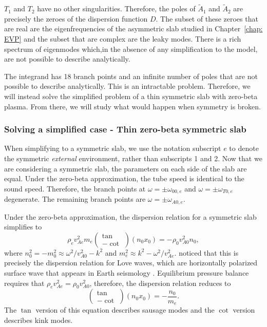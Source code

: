 \documentclass[12pt]{../style-files/ociamthesis}
\begin{document}
$T_1$ and $T_2$ have no other singularities. Therefore, the poles of $\tilde{A}_1$ and $\tilde{A}_2$ are precisely the zeroes of the dispersion function $D$. The subset of these zeroes that are real are the eigenfrequencies of the asymmetric slab studied in Chapter~\ref{chap: EVP} and the subset that are complex are the leaky modes. There is a rich spectrum of eigenmodes which,in the absence of any simplification to the model, are not possible to describe analytically.

The integrand has 18 branch points and an infinite number of poles that are not possible to describe analytically. This is an intractable problem. Therefore, we will instead solve the simplified problem of a thin symmetric slab with zero-beta plasma. From there, we will study what would happen when symmetry is broken.

\subsubsection{Solving a simplified case - Thin zero-beta symmetric slab}

When simplifying to a symmetric slab, we use the notation subscript $e$ to denote the symmetric \textit{external} environment, rather than subscripts 1 and 2. Now that we are considering a symmetric slab, the parameters on each side of the slab are equal. Under the zero-beta approximation, the tube speed is identical to the sound speed. Therefore, the branch points at $\omega = \pm \omega_{00,e}$ and $\omega = \pm\omega_{T0,e}$ degenerate. The remaining branch points are $\omega = \pm \omega_{A0,e}$.

Under the zero-beta approximation, the dispersion relation for a symmetric slab simplifies to
\begin{equation}
\rho_ev_{Ae}^2m_e\left(
\begin{matrix}
\tan \\
-\cot
\end{matrix} \right)(n_0x_0) = -\rho_0v_{A0}^2n_0,
\end{equation}
where $n_0^2 = -m_0^2 \approx \omega^2/v_{A0}^2 - k^2$ and $m_e^2 \approx k^2 - \omega^2/v_{Ae}^2$. \cite{edw_etal82} noticed that this is precisely the dispersion relation for Love waves, which are horizontally polarized surface wave that appears in Earth seismology \citep{lov11}. Equilibrium pressure balance requires that $\rho_ev_{Ae}^2 = \rho_0v_{A0}^2$, therefore, the dispersion relation reduces to
\begin{equation}
\left(
\begin{matrix}
\tan \\
-\cot
\end{matrix} \right)(n_0x_0) = -\frac{n_0}{m_e}.
\end{equation}
The $\tan$ version of this equation describes sausage modes and the $\cot$ version describes kink modes.
\end{document}
